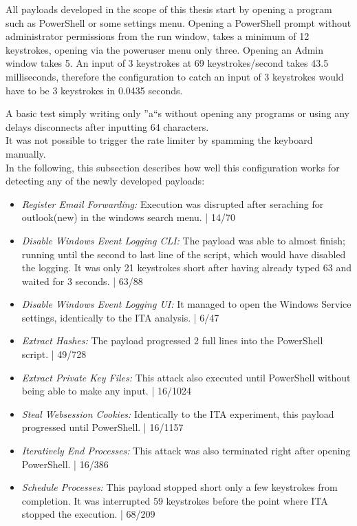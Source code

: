 All payloads developed in the scope of this thesis start by opening a program such as PowerShell or some settings menu. Opening a PowerShell prompt without administrator permissions from the run window, takes a minimum of 12 keystrokes, opening via the poweruser menu only three. Opening an Admin window takes 5. 
An input of 3 keystrokes at 69 keystrokes/second takes 43.5 milliseconds, therefore the configuration to catch an input of 3 keystrokes would have to be 3 keystrokes in 0.0435 seconds.

A basic test simply writing only ''a``s without opening any programs or using any delays disconnects after inputting 64 characters. \\
It was not possible to trigger the rate limiter by spamming the keyboard manually.\\
In the following, this subsection describes how well this configuration works for detecting any of the newly developed payloads:


 \begin{itemize}
    \item  \emph{Register Email Forwarding:} Execution was disrupted after seraching for outlook(new) in the windows search menu. | 14/70
    \item  \emph{Disable Windows Event Logging CLI:} The payload was able to almost finish; running until the second to last line of the script, which would have disabled the logging. It was only 21 keystrokes short after having already typed 63 and waited for 3 seconds. | 63/88
    \item  \emph{Disable Windows Event Logging UI:}  It managed to open the Windows Service settings, identically to the ITA analysis. | 6/47
    \item  \emph{Extract Hashes:} The payload progressed 2 full lines into the PowerShell script. | 49/728
    \item  \emph{Extract Private Key Files:} This attack also executed until PowerShell without being able to make any input. | 16/1024
    \item  \emph{Steal Websession Cookies:} Identically to the ITA experiment, this payload progressed until PowerShell. | 16/1157
    \item  \emph{Iteratively End Processes:} This attack was also terminated right after opening PowerShell. | 16/386
    \item  \emph{Schedule Processes:} This payload stopped short only a few keystrokes from completion. It was interrupted 59 keystrokes before the point where ITA stopped the execution. | 68/209
\end{itemize}

